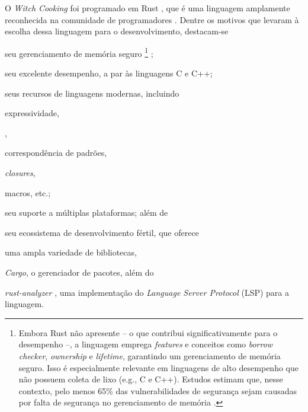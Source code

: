 \documentclass
  [11pt,a4paper,english,brazil,openright,sumario=tradicional,twoside]
  {abntex2}
\newcommand{\witchcooking}{\textit{Witch Cooking}\xspace}
\begin{document}
  O \witchcooking foi programado em Rust \cite{rust-2023-rust}, que é uma
  linguagem amplamente reconhecida na comunidade de programadores
  \cite{stack-overflow-2023-stack}. Dentre os motivos que levaram à escolha
  dessa linguagem para o desenvolvimento, destacam-se
  \begin{inparaenum}
    \item seu gerenciamento de memória seguro%
          \footnote
            { Embora Rust não apresente \textit{} --
              o que contribui significativamente para o desempenho --, a
              linguagem emprega \textit{features} e conceitos como
              \textit{borrow checker}, \textit{ownership} e \textit{lifetime},
              garantindo um gerenciamento de memória seguro. Isso é
              especialmente relevante em linguagens de alto desempenho que não
              possuem coleta de lixo (e.g., C e C++). Estudos estimam que,
              nesse contexto, pelo menos 65\% das vulnerabilidades de segurança
              sejam causadas por falta de segurança no gerenciamento de memória
              \cite{gaynor-2020-what}.}
          \cite[3]{nsa-2022-software};
    \item seu excelente desempenho, a par às linguagens C e C++;
    \item seus recursos de linguagens modernas, incluindo
          \begin{inparaenum}
            \item expressividade,
            \item \textit{},
            \item correspondência de padrões,
            \item \textit{closures},
            \item macros, etc.;
          \end{inparaenum}
    \item seu suporte a múltiplas plataformas; além de
    \item seu ecossistema de desenvolvimento fértil, que oferece
          \begin{inparaenum}
            \item uma ampla variedade de bibliotecas,
            \item \textit{Cargo}, o gerenciador de pacotes, além do
            \item \textit{rust-analyzer} \cite{rust-analyzer-2023-rust}, uma
                  implementação do \textit{Language Server Protocol} (LSP) para
                  a linguagem.
          \end{inparaenum}
  \end{inparaenum}
\end{document}
